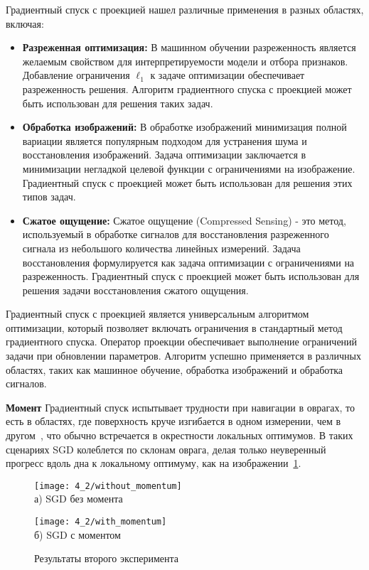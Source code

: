 Градиентный спуск с проекцией нашел различные применения
в разных областях, включая:

\begin{itemize}
    \item \textbf{Разреженная оптимизация:}
    В машинном обучении разреженность является желаемым
    свойством для интерпретируемости модели и отбора признаков.
    Добавление ограничения $\ell_1$ к задаче оптимизации
    обеспечивает разреженность решения.
    Алгоритм градиентного спуска с проекцией может
    быть использован для решения таких задач.

    \item \textbf{Обработка изображений:} В обработке изображений
    минимизация полной вариации является популярным подходом
    для устранения шума и восстановления изображений.
    Задача оптимизации заключается в минимизации негладкой целевой
    функции с ограничениями на изображение.
    Градиентный спуск с проекцией может быть
    использован для решения этих типов задач.

    \item \textbf{Сжатое ощущение:} Сжатое ощущение
    (Compressed Sensing) - это метод, используемый в обработке
    сигналов для восстановления разреженного сигнала из
    небольшого количества линейных измерений.
    Задача восстановления формулируется как задача оптимизации
    с ограничениями на разреженность.
    Градиентный спуск с проекцией может быть использован для
    решения задачи восстановления сжатого ощущения.
\end{itemize}

Градиентный спуск с проекцией является универсальным алгоритмом
оптимизации, который позволяет включать ограничения в
стандартный метод градиентного спуска.
Оператор проекции обеспечивает выполнение
ограничений задачи при обновлении параметров.
Алгоритм успешно применяется в различных областях, таких как
машинное обучение, обработка изображений и обработка сигналов.


\textbf{Момент}
Градиентный спуск испытывает трудности при навигации в оврагах,
то есть в областях, где поверхность круче изгибается в одном измерении,
чем в другом~\cite{Sutton1986},
что обычно встречается в окрестности локальных оптимумов.
В таких сценариях SGD колеблется по склонам оврага,
делая только неуверенный
прогресс вдоль дна к локальному оптимуму, как на изображении~\ref{fig:momentums}.

\begin{figure}[ht]
    \begin{minipage}[b][][b]{0.49\linewidth}\centering
        \texttt{[image: 4\_2/without\_momentum]} \\ а) SGD без момента
    \end{minipage}
    \hfill
    \begin{minipage}[b][][b]{0.49\linewidth}\centering
        \texttt{[image: 4\_2/with\_momentum]} \\ б) SGD с моментом
    \end{minipage}
    \caption{Результаты второго эксперимента}\label{fig:momentums}
\end{figure}

